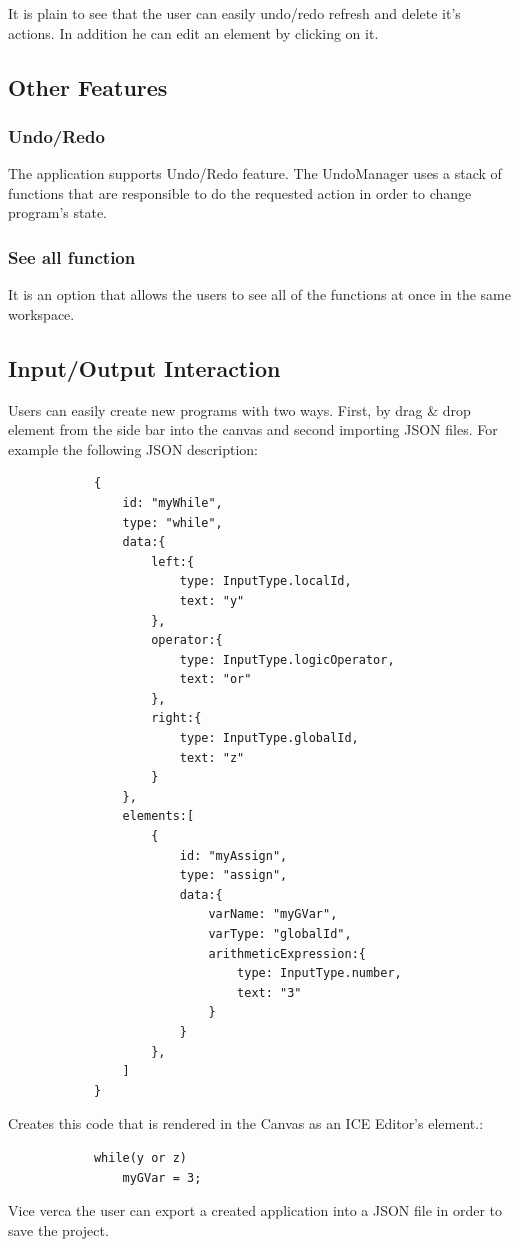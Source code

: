 \documentclass[paper=a4, fontsize=11pt]{scrartcl}
\begin{document}
		It is plain to see that the user can easily undo/redo refresh and delete it's actions. In addition he can edit an element by clicking on it.

	\subsection{Other Features}

		\subsubsection{Undo/Redo}
			The application supports Undo/Redo feature. The UndoManager uses a stack of functions that are responsible to do the requested action in order to change program's state.

		\subsubsection{See all function}
			It is an option that allows the users to see all of the functions at once in the same workspace.

	\subsection{Input/Output Interaction}
		Users can easily create new programs with two ways. First, by drag \& drop element from the side bar into the canvas and second importing JSON files. For example the following JSON description:

		\begin{lstlisting}
			{
			    id: "myWhile",
			    type: "while",
			    data:{
			        left:{
			            type: InputType.localId,
			            text: "y"
			        },
			        operator:{
			            type: InputType.logicOperator,
			            text: "or"
			        },
			        right:{
			            type: InputType.globalId,
			            text: "z"
			        }
			    },
			    elements:[
			        {
			            id: "myAssign",
			            type: "assign",
			            data:{
			                varName: "myGVar",
			                varType: "globalId",
			                arithmeticExpression:{
			                    type: InputType.number,
			                    text: "3"
			                }
			            }
			        },
			    ]
			}
		\end{lstlisting}
		Creates this code that is rendered in the Canvas as an ICE Editor's element.:
		\begin{lstlisting}
			while(y or z)
				myGVar = 3;
		\end{lstlisting}
		
		Vice verca the user can export a created application into a JSON file in order to save the project.

\end{document}
